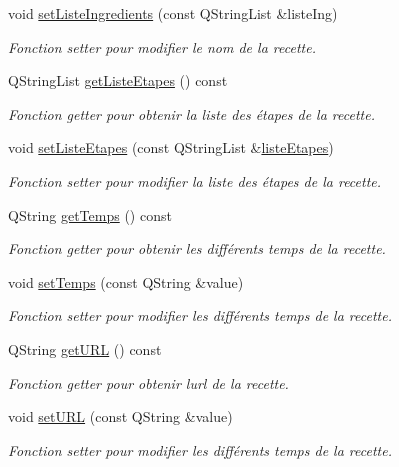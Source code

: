 \begin{DoxyCompactItemize}
void \hyperlink{classRecette_a08b6eff8e2b20a39edf7fc04c2a827f9}{set\+Liste\+Ingredients} (const Q\+String\+List \&liste\+Ing)
\begin{DoxyCompactList}\small\item\em Fonction setter pour modifier le nom de la recette. \end{DoxyCompactList}\item 
Q\+String\+List \hyperlink{classRecette_a3b2807fe1f55431bcd632bff2332c6e7}{get\+Liste\+Etapes} () const
\begin{DoxyCompactList}\small\item\em Fonction getter pour obtenir la liste des étapes de la recette. \end{DoxyCompactList}\item 
void \hyperlink{classRecette_a3a5b4231baeeae0a30588d1ca29c7e4e}{set\+Liste\+Etapes} (const Q\+String\+List \&\hyperlink{classRecette_addbf40a642849e6583ac7fd3e2059e0d}{liste\+Etapes})
\begin{DoxyCompactList}\small\item\em Fonction setter pour modifier la liste des étapes de la recette. \end{DoxyCompactList}\item 
Q\+String \hyperlink{classRecette_a9ac38f333d17699fb6601bca332d8567}{get\+Temps} () const
\begin{DoxyCompactList}\small\item\em Fonction getter pour obtenir les différents temps de la recette. \end{DoxyCompactList}\item 
void \hyperlink{classRecette_a51b797af44e9bc45811e44bd42f461af}{set\+Temps} (const Q\+String \&value)
\begin{DoxyCompactList}\small\item\em Fonction setter pour modifier les différents temps de la recette. \end{DoxyCompactList}\item 
Q\+String \hyperlink{classRecette_ab06006324a8201e9967b53273dbf2751}{get\+U\+RL} () const
\begin{DoxyCompactList}\small\item\em Fonction getter pour obtenir l\textquotesingle{}url de la recette. \end{DoxyCompactList}\item 
void \hyperlink{classRecette_ac910b38482d259cba788f41669e765b1}{set\+U\+RL} (const Q\+String \&value)
\begin{DoxyCompactList}\small\item\em Fonction setter pour modifier les différents temps de la recette. \end{DoxyCompactList}\item 

\end{DoxyCompactItemize}
